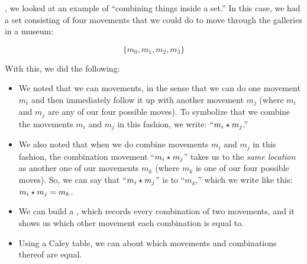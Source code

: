 \documentclass[../../../main.tex]{subfiles}
\begin{document}
, we looked at an example of ``combining things inside a set.'' In this case, we had a set consisting of four movements that we could do to move through the galleries in a museum: 

\begin{equation*}
  \{ m_{0}, m_{1}, m_{2}, m_{3} \}
\end{equation*}

With this, we did the following:

\begin{itemize}

  \item We noted that we can  movements, in the sense that we can do one movement $m_{i}$ and then immediately follow it up with another movement $m_{j}$ (where $m_{i}$ and $m_{j}$ are any of our four possible moves). To symbolize that we combine the movements $m_{i}$ and $m_{j}$ in this fashion, we write: ``$m_{i} \opSymbol/ m_{j}$.''
  
  \item We also noted that when we do combine movements $m_{i}$ and $m_{j}$ in this fashion, the combination movement ``$m_{i} \opSymbol/ m_{j}$'' takes us to the \emph{same location} as another one of our movements $m_{k}$ (where $m_{k}$ is one of our four possible moves). So, we can say that ``$m_{i} \opSymbol/ m_{j}$'' is  to ``$m_{k}$,'' which we write like this: $\op{m_{i}}{m_{j}} = m_{k}$.
  
  \item We can build a , which records every combination of two movements, and it shows us which other movement each combination is equal to.
  
  \item Using a Caley table, we can  about which movements and combinations thereof are equal.

\end{itemize}
\end{document}
